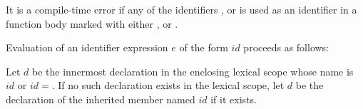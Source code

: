 \documentclass{article}
\begin{document}
\LMHash{}
It is a compile-time error if any of the identifiers \ASYNC, \AWAIT{} or \YIELD{} is used as an identifier in a function body marked with either \ASYNC{}, \ASYNC* or \SYNC*.


\LMHash{}
Evaluation of an identifier expression $e$ of the form $id$ proceeds as follows:

\LMHash{}
Let $d$ be the innermost declaration in the enclosing lexical scope whose name is $id$ or $id=$.
If no such declaration exists in the lexical scope, let $d$ be the declaration of the inherited member named $id$ if it exists.
\end{document}
